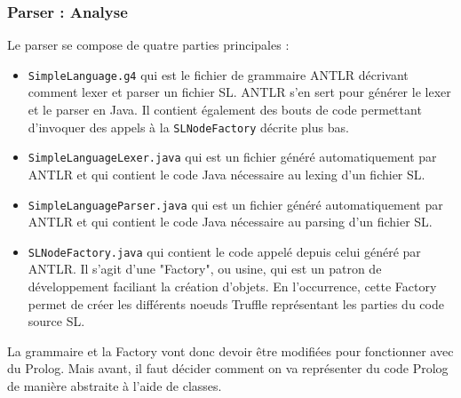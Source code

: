 \documentclass[../report.tex]{subfiles}
\begin{document}
\subsubsection{Parser : Analyse}
Le parser se compose de quatre parties principales :
\begin{itemize}
    \item \texttt{SimpleLanguage.g4} qui est le fichier de grammaire ANTLR décrivant comment lexer et parser un fichier SL. ANTLR s'en sert pour générer le lexer et le parser en Java. Il contient également des bouts de code permettant d'invoquer des appels à la \texttt{SLNodeFactory} décrite plus bas.
    \item \texttt{SimpleLanguageLexer.java} qui est un fichier généré automatiquement par ANTLR et qui contient le code Java nécessaire au lexing d'un fichier SL.
    \item \texttt{SimpleLanguageParser.java} qui est un fichier généré automatiquement par ANTLR et qui contient le code Java nécessaire au parsing d'un fichier SL.
    \item \texttt{SLNodeFactory.java} qui contient le code appelé depuis celui généré par ANTLR. Il s'agit d'une "Factory", ou usine, qui est un patron de développement faciliant la création d'objets. En l'occurrence, cette Factory permet de créer les différents noeuds Truffle représentant les parties du code source SL.
\end{itemize}
La grammaire et la Factory vont donc devoir être modifiées pour fonctionner avec du Prolog. Mais avant, il faut décider comment on va représenter du code Prolog de manière abstraite à l'aide de classes.
\end{document}

